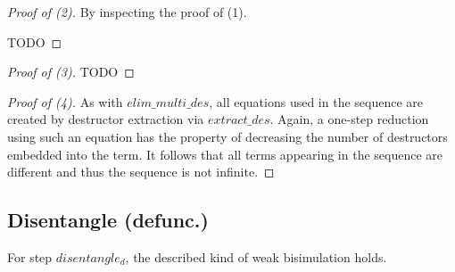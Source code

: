 \documentclass[11pt]{article} %
\begin{document}
\begin{proof}[Proof of (2)] By inspecting the proof of (1).

TODO

\end{proof}

\begin{proof}[Proof of (3)]

TODO

\end{proof}

\begin{proof}[Proof of (4)] As with $elim\_multi\_des$, all equations used in the sequence are created by destructor extraction via $extract\_des$. Again, a one-step reduction using such an equation has the property of decreasing the number of destructors embedded into the term. It follows that all terms appearing in the sequence are different and thus the sequence is not infinite.

\end{proof}

\subsection{Disentangle (defunc.)}

For step $disentangle_d$, the described kind of weak bisimulation holds.
\end{document}
